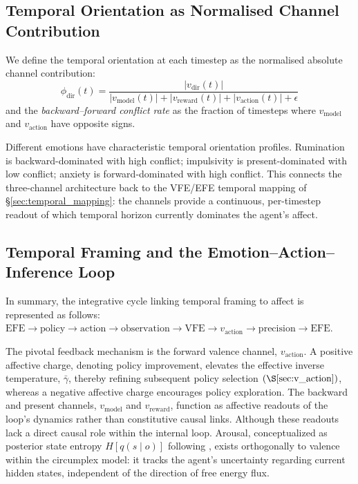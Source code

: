 \documentclass[11pt,a4paper]{article}
\begin{document}
\subsection{Temporal Orientation as Normalised Channel Contribution}\label{sec:temporal_orientation}

We define the temporal orientation at each timestep as the normalised absolute channel contribution:
\begin{equation}
    \phi_{\text{dir}}(t) = \frac{|v_{\text{dir}}(t)|}{|v_{\text{model}}(t)| + |v_{\text{reward}}(t)| + |v_{\text{action}}(t)| + \epsilon}
\end{equation}
and the \emph{backward--forward conflict rate} as the fraction of timesteps where $v_{\text{model}}$ and $v_{\text{action}}$ have opposite signs.

Different emotions have characteristic temporal orientation profiles. Rumination is backward-dominated with high conflict; impulsivity is present-dominated with low conflict; anxiety is forward-dominated with high conflict. This connects the three-channel architecture back to the VFE/EFE temporal mapping of \S\ref{sec:temporal_mapping}: the channels provide a continuous, per-timestep readout of which temporal horizon currently dominates the agent's affect.



\subsection{Temporal Framing and the Emotion--Action--Inference Loop}\label{sec:loop}


In summary, the integrative cycle linking temporal framing to affect is represented as follows: \(\mathrm{EFE} \to \mathrm{policy} \to \mathrm{action} \to \mathrm{observation} \to \mathrm{VFE} \to v_{\mathrm{action}} \to \mathrm{precision} \to \mathrm{EFE}\).

The pivotal feedback mechanism is the forward valence channel, \(v_{\mathrm{action}}\). A positive affective charge, denoting policy improvement, elevates the effective inverse temperature, \(\bar{\gamma}\), thereby refining subsequent policy selection \(\left(\S\ref{sec:v_action}\right)\), whereas a negative affective charge encourages policy exploration. The backward and present channels, \(v_{\mathrm{model}}\) and \(v_{\mathrm{reward}}\), function as affective readouts of the loop's dynamics rather than constitutive causal links. Although these readouts lack a direct causal role within the internal loop. Arousal, conceptualized as posterior state entropy \(H[q(s \mid o)]\) following \citet{pattisapu2024free}, exists orthogonally to valence within the circumplex model: it tracks the agent's uncertainty regarding current hidden states, independent of the direction of free energy flux.
\end{document}
